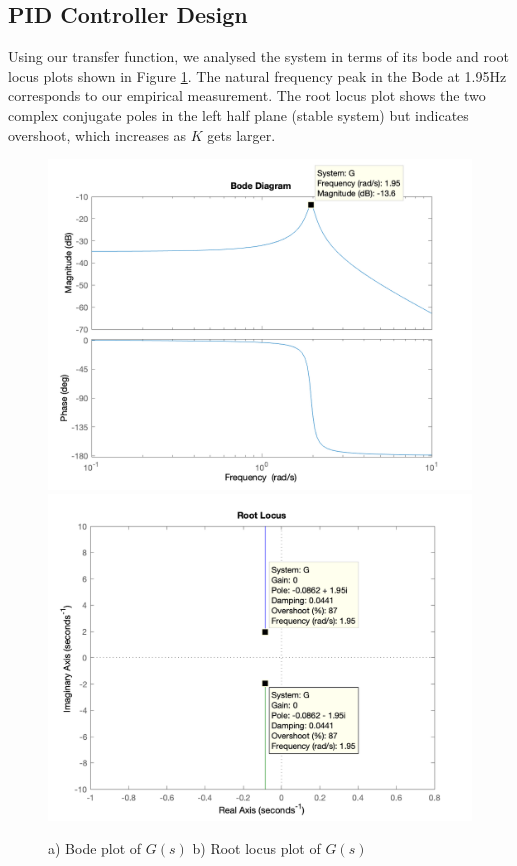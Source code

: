 \documentclass[11pt]{article}
\begin{document}
\subsection{PID Controller Design}
Using our transfer function, we analysed the system in terms of its bode and root locus plots shown in Figure \ref{fig:G_bode_rlocus}. The natural frequency peak in the Bode at 1.95Hz corresponds to our empirical measurement. The root locus plot shows the two complex conjugate poles in the left half plane (stable system) but indicates overshoot, which increases as $K$ gets larger. 
\begin{figure}[ht!]
    \centering
    \includegraphics[scale=0.44]{W2GBode.png}
    \includegraphics[scale=0.44]{W2Grlocus.png}
    \caption{a) Bode plot of $G(s)$ b) Root locus plot of $G(s)$}
    \label{fig:G_bode_rlocus}
\end{figure}
\end{document}
